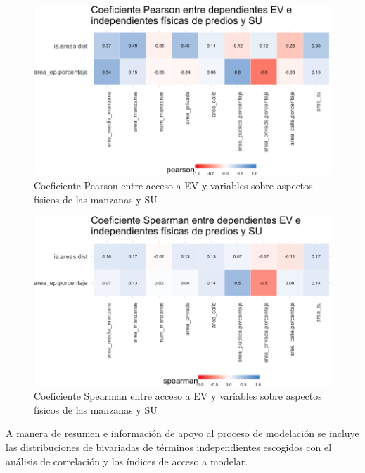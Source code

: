\documentclass[12pt,]{book}
\begin{document}
\begin{figure}
\includegraphics[width=1\linewidth]{tesis-unigis_files/figure-latex/tile-ev-fisica-pearson-1} \caption{Coeficiente Pearson entre acceso a EV y variables sobre aspectos físicos de las manzanas y SU}\label{fig:tile-ev-fisica-pearson}
\end{figure}

\begin{figure}
\includegraphics[width=1\linewidth]{tesis-unigis_files/figure-latex/tile-ev-fisica-spearman-1} \caption{Coeficiente Spearman entre acceso a EV y variables sobre aspectos físicos de las manzanas y SU}\label{fig:tile-ev-fisica-spearman}
\end{figure}

A manera de resumen e información de apoyo al proceso de modelación se
incluye las distribuciones de bivariadas de términos independientes
escogidos con el análisis de correlación y los índices de acceso a
modelar.
\end{document}
